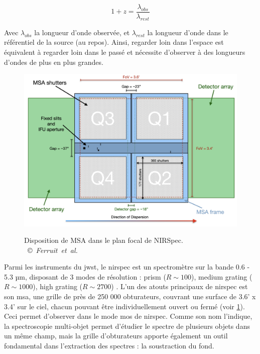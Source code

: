 \documentclass[11pt, a4paper]{article}
\newcommand{\customcite}[2]{\mbox{
  {\small \copyright} \textit{#1} \cite{#2}}
}
\begin{document}
\begin{equation}
    1 + z = \frac{\lambda_{obs}}{\lambda_{rest}}
\end{equation}

Avec $\lambda_{obs}$ la longueur d'onde observée, et $\lambda_{rest}$ la longueur d'onde dans le référentiel de la source (au repos). Ainsi, regarder loin dans l'espace est équivalent à regarder loin dans le passé et nécessite d'observer à des longueurs d'ondes de plus en plus grandes.

\begin{figure}[H]
  \centering
  \includegraphics[scale=0.25]{assets/msa_ds_new.png}
  \label{fig:msa_shutter}
  \caption{Disposition de MSA dans le plan focal de NIRSpec. \customcite{Ferruit et al.}{2022A&A...661A..81F}}
\end{figure}

Parmi les instruments du \gls{jwst}, le \gls{nirspec} est un spectromètre sur la bande 0.6 - 5.3  µm, disposant de 3 modes de résolution : prism ($R \sim 100$), medium grating ($R \sim 1000$), high grating ($R \sim 2700$) \cite{nirspec}. L'un des atouts principaux de \gls{nirspec} est son \gls{msa}, une grille de près de 250 000 obturateurs, couvrant une surface de 3.6' x 3.4' sur le ciel, chacun pouvant être individuellement ouvert ou fermé \cite{msa} (voir \ref{fig:msa_shutter}). Ceci permet d'observer dans le mode \gls{mos} de \gls{nirspec}. Comme son nom l'indique, la spectroscopie multi-objet permet d'étudier le spectre de plusieurs objets dans un même champ, mais la grille d'obturateurs apporte également un outil fondamental dans l'extraction des spectres : la soustraction du fond.
\end{document}
